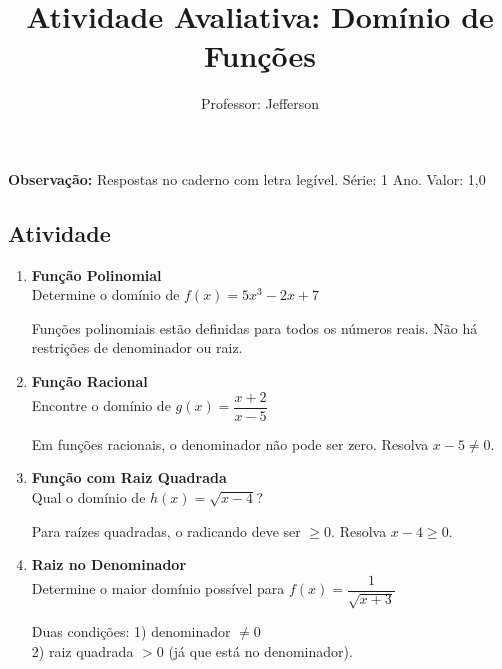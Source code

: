 \documentclass[11pt]{article}
\title{\textcolor{titleblue}{Atividade Avaliativa: Domínio de Funções }}
\author{Professor: Jefferson}
\date{}
\begin{document}
\maketitle
\vspace{-1cm}

\begin{center}
    \large{\textbf{Observação:} Respostas no caderno com letra legível. \quad Série: 1 Ano. Valor: 1,0 }
\end{center}

\begin{multicols}{2}

\section*{Atividade}
\begin{enumerate}

\item \textbf{Função Polinomial}\\
Determine o domínio de $f(x) = 5x^3 - 2x + 7$
\begin{tcolorbox}[colback=explanationbg,colframe=titleblue,title=Dica:]
Funções polinomiais estão definidas para todos os números reais. Não há restrições de denominador ou raiz.
\end{tcolorbox}

\item \textbf{Função Racional}\\
Encontre o domínio de $g(x) = \dfrac{x+2}{x-5}$
\begin{tcolorbox}[colback=explanationbg,colframe=titleblue,title=Dica:]
Em funções racionais, o denominador não pode ser zero. Resolva $x-5 \neq 0$.
\end{tcolorbox}

\item \textbf{Função com Raiz Quadrada}\\
Qual o domínio de $h(x) = \sqrt{x-4}$?
\begin{tcolorbox}[colback=explanationbg,colframe=titleblue,title=Dica:]
Para raízes quadradas, o radicando deve ser $\geq 0$. Resolva $x-4 \geq 0$.
\end{tcolorbox}

\item \textbf{Raiz no Denominador}\\
Determine o maior domínio possível para $f(x) = \dfrac{1}{\sqrt{x+3}}$
\begin{tcolorbox}[colback=explanationbg,colframe=titleblue,title=Dica:]
Duas condições: 1) denominador $\neq 0$  \\ 2) raiz quadrada $> 0$ (já que está no denominador).
\end{tcolorbox}


\end{enumerate}
\end{multicols}
\end{document}
